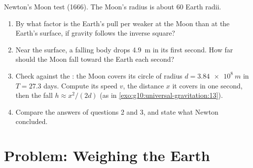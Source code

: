 \begin{exercise}[$\star\star\star$]\label{exo:g10:universal-gravitation:15}
Newton's Moon test (1666). The Moon's  radius is about $60$ Earth
radii.
\begin{enumerate}
  \item By what factor is the Earth's pull per  weaker at the
        Moon than at the Earth's surface, if gravity follows the
        inverse square?
  \item Near the surface, a falling body drops \qty{4.9}{m} in its
        first second. How far should the Moon fall toward the Earth
        each second?
  \item Check against the : the Moon covers its circle of radius
        $d = \qty{3.84e8}{m}$ in $T = 27.3$ days. Compute its speed
        $v$, the distance $x$ it covers in one second, then the fall
        $h \approx x^2/(2d)$ (as in
        \cref{exo:g10:universal-gravitation:13}).
  \item Compare the answers of questions 2 and 3, and state what Newton
        concluded.
\end{enumerate}
\end{exercise}

\section{Problem: Weighing the Earth}

